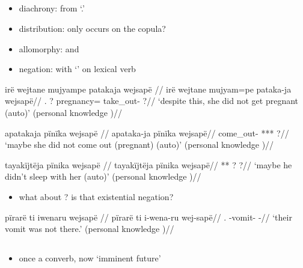 \documentclass{memoir}
\begin{document}
\subsection{\texorpdfstring{}{}}

\begin{itemize}
\tightlist
\item
  diachrony: from  `.'
\item
  distribution: only occurs on the copula?
\item
  allomorphy:  and 
\item
  negation: with  `' on lexical verb
\end{itemize}

\ex \label{ctoaragrme-38}
\begingl \glpreamble irë wejtane mujyampe patakaja wejsapë //
\gla irë wejtane mujyam=pe pataka-ja wejsapë//
\glb {}. ? pregnancy= take\_out- ?//
\glft ‘despite this, she did not get pregnant (auto)’ (personal knowledge
)//
\endgl
\xe

\ex \label{ctoaragrme-39}
\begingl \glpreamble apatakaja pïnïka wejsapë //
\gla apataka-ja pïnïka wejsapë//
\glb come\_out- *** ?//
\glft ‘maybe she did not come out (pregnant) (auto)’ (personal knowledge
)//
\endgl
\xe

\ex \label{ctoaragrme-40}
\begingl \glpreamble tayakïjtëja pïnika wejsapë //
\gla tayakïjtëja pïnika wejsapë//
\glb *** ? ?//
\glft ‘maybe he didn't sleep with her (auto)’ (personal knowledge
)//
\endgl
\xe

\begin{itemize}
\tightlist
\item
  what about ? is that existential negation?
\end{itemize}

\ex \label{ctorat-19}
\begingl \glpreamble pïrarë ti iwenaru wejsapë //
\gla pïrarë ti i-wena-ru wej-sapë//
\glb {}.  -vomit- -//
\glft ‘their vomit was not there.’ (personal knowledge
)//
\endgl
\xe

\subsection{\texorpdfstring{ \label{sec:sareimn}}{ }}

\begin{itemize}
\tightlist
\item
  once a converb, now `imminent future'
\end{itemize}
\end{document}
